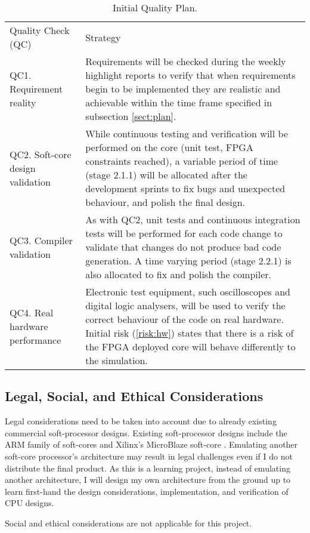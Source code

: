 \begin{table}[h]
    \begin{tabularx}{\textwidth}{|l|X|}
    \hline
    Quality Check (QC) & Strategy \\
	\specialrule{2pt}{-2pt}{0pt}
	QC1. Requirement reality & Requirements will be checked during the weekly highlight reports to verify that when requirements begin to be implemented they are realistic and achievable within the time frame specified in subsection \ref{sect:plan}.
	\\ \hline
	
	QC2. Soft-core design validation & While continuous testing and verification will be performed on the core (unit test, FPGA constraints reached), a variable period of time (stage 2.1.1) will be allocated after the development sprints to fix bugs and unexpected behaviour, and polish the final design. 
	\\ \hline
	
	QC3. Compiler validation & As with QC2, unit tests and continuous integration tests will be performed for each code change to validate that changes do not produce bad code generation. A time varying period (stage 2.2.1) is also allocated to fix and polish the compiler.
	\\ \hline
	
	QC4. Real hardware performance & Electronic test equipment, such oscilloscopes and digital logic analysers, will be used to verify the correct behaviour of the code on real hardware. Initial risk (\ref{risk:hw}) states that there is a risk of the FPGA deployed core will behave differently to the simulation.
	\\ \hline
    \end{tabularx}
    \caption{Initial Quality Plan.}
\end{table}


\subsection*{Legal, Social, and Ethical Considerations}\label{sect:legal}
Legal considerations need to be taken into account due to already existing commercial soft-processor designs. Existing soft-processor designs include the ARM family of soft-cores \citep{arm} and Xilinx's MicroBlaze soft-core \citep{microblaze}. Emulating another soft-core processor's architecture may result in legal challenges even if I do not distribute the final product. As this is a learning project, instead of emulating another architecture, I will design my own architecture from the ground up to learn first-hand the design considerations, implementation, and verification of CPU designs.

Social and ethical considerations are not applicable for this project.
